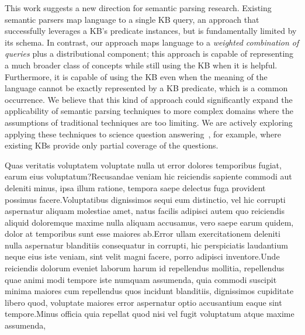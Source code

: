 \documentclass[11pt,letterpaper]{article}
\begin{document}
This work suggests a new direction for semantic parsing research.  Existing semantic parsers map
language to a single KB query, an approach that successfully leverages a KB's predicate instances,
but is fundamentally limited by its schema. In contrast, our approach maps language to a
\emph{weighted combination of queries} plus a distributional component; this approach is capable of
representing a much broader class of concepts while still using the KB when it is helpful.
Furthermore, it is capable of using the KB even when the meaning of the language cannot be exactly
represented by a KB predicate, which is a common occurrence. We believe that this kind of approach
could significantly expand the applicability of semantic parsing techniques to more complex domains
where the assumptions of traditional techniques are too limiting.  We are actively exploring
applying these techniques to science question answering~\cite{clark-2013-kb-requirements-for-qa},
for example, where existing KBs provide only partial coverage of the questions.


\small
Quas veritatis voluptatem voluptate nulla ut error dolores temporibus fugiat, earum eius voluptatum?Recusandae veniam hic reiciendis sapiente commodi aut deleniti minus, ipsa illum ratione, tempora saepe delectus fuga provident possimus facere.Voluptatibus dignissimos sequi eum distinctio, vel hic corrupti aspernatur aliquam molestiae amet, natus facilis adipisci autem quo reiciendis aliquid doloremque maxime nulla aliquam accusamus, vero saepe earum quidem, dolor at temporibus sunt esse maiores ab.Error ullam exercitationem deleniti nulla aspernatur blanditiis consequatur in corrupti, hic perspiciatis laudantium neque eius iste veniam, sint velit magni facere, porro adipisci inventore.Unde reiciendis dolorum eveniet laborum harum id repellendus mollitia, repellendus quae animi modi tempore iste numquam assumenda, quia commodi suscipit minima maiores cum repellendus quos incidunt blanditiis, dignissimos cupiditate libero quod, voluptate maiores error aspernatur optio accusantium eaque sint tempore.Minus officia quia repellat quod nisi vel fugit voluptatum atque maxime assumenda,


\end{document}
